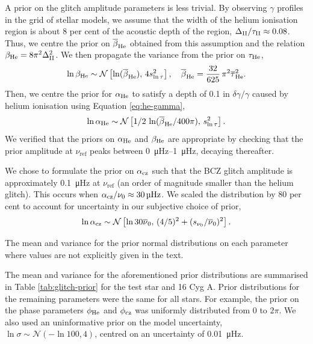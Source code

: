 A prior on the glitch amplitude parameters is less trivial. By observing \(\gamma\) profiles in the grid of stellar models, we assume that the width of the helium ionisation region is about 8 per cent of the acoustic depth of the region, \(\Delta_{{\mathrm{II}}}/\tau_{{\mathrm{II}}} \approx 0.08\). Thus, we centre the prior on \(\overline{\beta}_{{\mathrm{He}}}\) obtained from this assumption and the relation \(\beta_{{\mathrm{He}}} = 8\pi^2\Delta_{{\mathrm{II}}}^2\). We then propagate the variance from the prior on \(\tau_{{\mathrm{He}}}\),
%
\begin{equation*}
    \ln\beta_{{\mathrm{He}}} \sim \mathcal{N}\left[ \ln(\overline{\beta}_{{\mathrm{He}}}), \, 4 s_{\ln\tau}^2 \right], \quad \overline{\beta}_{{\mathrm{He}}} = \frac{32}{625} \, \pi^2 \overline{\tau}_{{\mathrm{He}}}^2.
\end{equation*}
%
Then, we centre the prior for \(\alpha_{{\mathrm{He}}}\) to satisfy a depth of 0.1 in \(\delta\gamma/\gamma\) caused by helium ionisation using Equation \ref{eq:he-gamma},
%
\begin{gather*}
    \ln\alpha_{{\mathrm{He}}} \sim \mathcal{N}\left[ 1/2 \, \ln({\overline{\beta}_{{\mathrm{He}}}}/{400\pi}), \, s_{\ln\tau}^2 \right].
\end{gather*}
%
We verified that the priors on \(\alpha_{{\mathrm{He}}}\) and \(\beta_{{\mathrm{He}}}\) are appropriate by checking that the prior amplitude at \(\nu_\mathrm{ref}\) peaks between \SIrange{0}{1}{\micro\hertz}, decaying thereafter.

We chose to formulate the prior on \(\alpha_{{\mathrm{cz}}}\) such that the BCZ glitch amplitude is approximately \SI{0.1}{\micro\hertz} at \(\nu_\mathrm{ref}\) (an order of magnitude smaller than the helium glitch). This occurs when \(\alpha_{{\mathrm{cz}}}/\nu_0 \approx \SI{30}{\micro\hertz}\). We scaled the distribution by 80 per cent to account for uncertainty in our subjective choice of prior,
%
\begin{equation*}
    \ln\alpha_{{\mathrm{cz}}} \sim \mathcal{N}\left[ \ln 30\overline{\nu}_0, \, (4/5)^2 + (s_{\nu_0}/\overline{\nu}_0)^2\right].
\end{equation*}
%

\begin{table}
    \centering
    \caption{The mean and variance for the prior normal distributions on each parameter where values are not explicitly given in the text.}
    \label{tab:glitch-prior}
    
\end{table}

The mean and variance for the aforementioned prior distributions are summarised in Table \ref{tab:glitch-prior} for the test star and 16 Cyg A. Prior distributions for the remaining parameters were the same for all stars. For example, the prior on the phase parameters \(\phi_{{\mathrm{He}}}\) and \(\phi_{{\mathrm{cz}}}\) was uniformly distributed from 0 to \(2\pi\). We also used an uninformative prior on the model uncertainty, \(\ln\sigma \sim \mathcal{N}( - \ln 100, 4)\), centred on an uncertainty of \SI{0.01}{\micro\hertz}.

